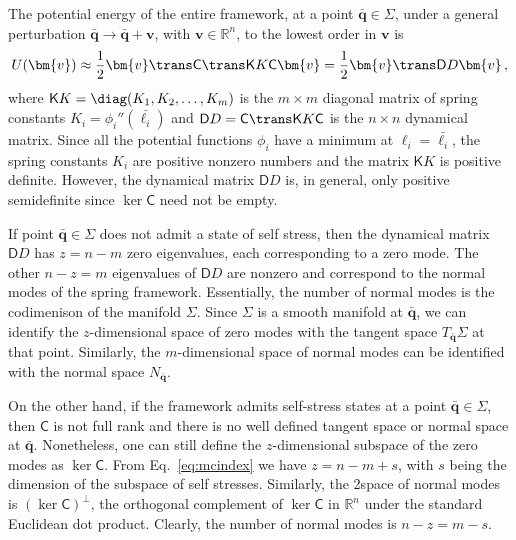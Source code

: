 The potential energy of the entire framework, at a point $\bar{\bm{q}} \in \Sigma$, under a general perturbation $\bar{\bm{q}} \to \bar{\bm{q}} + \bm{v}$, with $\bm{v} \in \mathbb{R}^n$, to the lowest order in $\bm{v}$ is
\begin{equation}
  U(\bm{v}) \approx \frac{1}{2}\bm{v}\trans\mathsf{C}\trans\mathsf{K}K\mathsf{C}\bm{v} = \frac{1}{2}\bm{v}\trans\mathsf{D}D\bm{v}\,,\label{eq:energy1}
\end{equation}
where $\mathsf{K}K = \diag(K_1, K_2, \ldots, K_m)$ is the $m\times m$ diagonal matrix of spring constants $K_i = \phi_i''(\bar{\ell_i})$ and $\mathsf{D}D = \mathsf{C}\trans\mathsf{K}K\mathsf{C}$ is the $n\times n$ dynamical matrix.
Since all the potential functions $\phi_i$ have a minimum at $\ell_i = \bar{\ell_i}$, the spring constants $K_i$ are positive nonzero numbers and the matrix $\mathsf{K}K$ is positive definite.
However, the dynamical matrix $\mathsf{D}D$ is, in general, only positive semidefinite since $\ker{\mathsf{C}}$ need not be empty.

If point $\bar{\bm{q}} \in \Sigma$ does not admit a state of self stress, then the dynamical matrix $\mathsf{D}D$ has $z = n - m$ zero eigenvalues, each corresponding to a zero mode.
The other $n - z = m$ eigenvalues of $\mathsf{D}D$ are nonzero and correspond to the normal modes of the spring framework.
Essentially, the number of normal modes is the codimenison of the manifold $\Sigma$.
Since $\Sigma$ is a smooth manifold at $\bar{\bm{q}}$, we can identify the $z$-dimensional space of zero modes with the tangent space $T_{\bar{\bm{q}}}\Sigma$ at that point.
Similarly, the $m$-dimensional space of normal modes can be identified with the normal space $N_{\bar{\bm{q}}}$.

On the other hand, if the framework admits self-stress states at a point $\bar{\bm{q}} \in \Sigma$, then $\mathsf{C}$ is not full rank and there is no well defined tangent space or normal space at $\bar{\bm{q}}$.
Nonetheless, one can still define the $z$-dimensional subspace of the zero modes as $\ker{\mathsf{C}}$.
From Eq.~\eqref{eq:mcindex} we have $z = n - m + s$, with $s$ being the dimension of the subspace of self stresses.
Similarly, the 2space of normal modes is $(\ker \mathsf{C})^\perp$, the orthogonal complement of $\ker{\mathsf{C}}$ in $\mathbb{R}^n$ under the standard Euclidean dot product.
Clearly, the number of normal modes is $n - z = m - s$.

